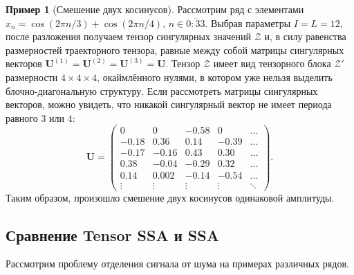 \documentclass[specialist,
    substylefile = spbu_report.rtx,
    subf,href,colorlinks=true, 12pt]{disser}
\theoremstyle{plain}
\theoremstyle{definition}
\newtheorem{example}{Пример}[section]
\theoremstyle{remark}
\begin{document}
    \begin{example}[Смешение двух косинусов]
        Рассмотрим ряд с элементами $x_n=\cos(2\pi n/3) + \cos(2\pi n/4)$, $n\in\overline{0:33}$.
        Выбрав параметры $I=L=12$, после разложения получаем тензор сингулярных значений $\mathcal{Z}$ и, в силу равенства размерностей
        траекторного тензора, равные между собой матрицы сингулярных векторов $\mathbf{U}^{(1)}=\mathbf{U}^{(2)}=\mathbf{U}^{(3)}=\mathbf{U}$.
        Тензор $\mathcal{Z}$ имеет вид тензорного блока $\mathcal{Z}'$ размерности $4\times 4\times 4$, окаймлённого нулями, в
        котором уже нельзя выделить блочно-диагональную структуру.
        Если рассмотреть матрицы сингулярных векторов, можно увидеть, что никакой сингулярный вектор не имеет периода равного $3$ или $4$:
        \[
            \mathbf{U}=
            \begin{pmatrix}
                0      & 0      & -0.58  & 0      & \ldots \\
                -0.18  & 0.36   & 0.14   & -0.39  & \ldots \\
                -0.17  & -0.16  & 0.43   & 0.30   & \ldots \\
                0.38   & -0.04  & -0.29  & 0.32   & \ldots \\
                0.14   & 0.002  & -0.14  & -0.54  & \ldots \\
                \vdots & \vdots & \vdots & \vdots & \ddots
            \end{pmatrix}.
        \]
        Таким образом, произошло смешение двух косинусов одинаковой амплитуды.
    \end{example}

    \subsection{Сравнение Tensor SSA и SSA}\label{subsec:comparison}
    Рассмотрим проблему отделения сигнала от шума на примерах различных рядов.
\end{document}
